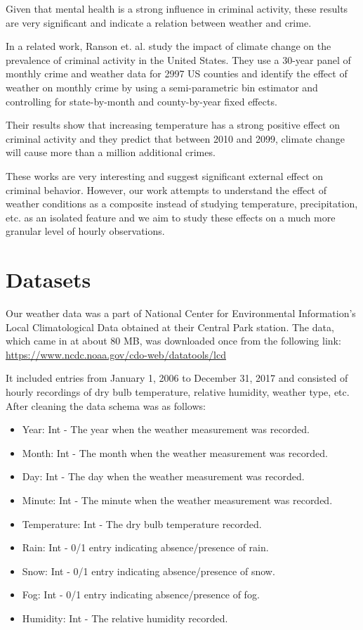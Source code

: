 \documentclass[conference]{IEEEtran}
\begin{document}
Given that mental health is a strong influence in criminal activity, these results are very significant and indicate a relation between weather and crime.

In a related work, Ranson et. al. \cite{b3} study the impact of climate change on the prevalence of criminal activity in the United States.
They use a 30-year panel of monthly crime and weather data for 2997 US counties and identify the effect of weather on monthly crime by using a semi-parametric bin estimator and controlling for state-by-month and county-by-year fixed effects.

Their results show that increasing temperature has a strong positive effect on criminal activity and they predict that between 2010 and 2099, climate change will cause more than a million additional crimes.

These works are very interesting and suggest significant external effect on criminal behavior. 
However, our work attempts to understand the effect of weather conditions as a composite instead of studying temperature, precipitation, etc. as an isolated feature and we aim to study these effects on a much more granular level of hourly observations.

\section{Datasets}
Our weather data was a part of National Center for Environmental Information's Local Climatological Data obtained at their Central Park station.
The data, which came in at about 80 MB, was downloaded once from the following link:
\underline{https://www.ncdc.noaa.gov/cdo-web/datatools/lcd}

It included entries from January 1, 2006 to December 31, 2017 and consisted of hourly recordings of dry bulb temperature, relative humidity, weather type, etc.
After cleaning the data schema was as follows:
\begin{itemize}
    \item Year: Int - The year when the weather measurement was recorded.
    \item Month: Int - The month when the weather measurement was recorded.
    \item Day: Int - The day when the weather measurement was recorded.
    \item Minute: Int - The minute when the weather measurement was recorded.
    \item Temperature: Int - The dry bulb temperature recorded.
    \item Rain: Int - 0/1 entry indicating absence/presence of rain.
    \item Snow: Int - 0/1 entry indicating absence/presence of snow.
    \item Fog: Int - 0/1 entry indicating absence/presence of fog.
    \item Humidity: Int - The relative humidity recorded.
\end{itemize}
\end{document}

